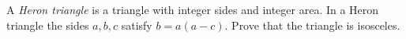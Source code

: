 A \emph{Heron triangle} is a triangle with integer sides and integer area. In a Heron triangle the sides $a,b,c$ satisfy $b=a(a-c)$. Prove that the triangle is isosceles.
